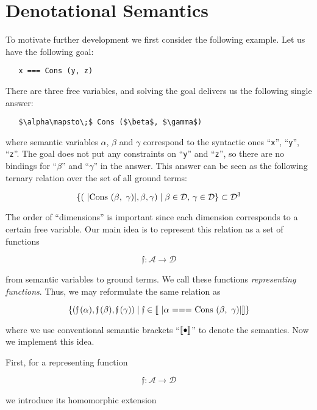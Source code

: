 \section{Denotational Semantics}
\label{denotational}

To motivate further development we first consider the following example. Let us have the following goal:

\begin{lstlisting}
   x === Cons (y, z)
\end{lstlisting}

There are three free variables, and solving the goal delivers us the following single answer:

\begin{lstlisting}
   $\alpha\mapsto\;$ Cons ($\beta$, $\gamma$)
\end{lstlisting}

where semantic variables $\alpha$, $\beta$ and $\gamma$ correspond to the syntactic ones ``\lstinline|x|'', ``\lstinline|y|'', ``\lstinline|z|''. The
goal does not put any constraints on ``\lstinline|y|'' and ``\lstinline|z|'', so there are no bindings for ``$\beta$'' and ``$\gamma$'' in the answer.
This answer can be seen as the following ternary relation over the set of all ground terms:

\[
\{(\mbox{\lstinline|Cons ($\beta$, $\,\gamma$)|}, \beta, \gamma) \mid \beta\in\mathcal{D},\,\gamma\in\mathcal{D}\}\subset\mathcal{D}^3
\]

The order of ``dimensions'' is important since each dimension corresponds to a certain free variable. Our main idea is to represent this relation as a set of functions 

\[
\mathfrak{f}:\mathcal{A}\to\mathcal{D}
\]

from semantic variables to ground terms. We call these functions \emph{representing functions}. Thus, we may reformulate the same relation as

\[
\{(\mathfrak{f}\,(\alpha),\mathfrak{f}\,(\beta),\mathfrak{f}\,(\gamma))\mid\mathfrak{f}\in\sembr{\mbox{\lstinline|$\alpha$ === Cons ($\beta$, $\,\gamma$)|}}\}
\]

where we use conventional semantic brackets ``$\llbracket{\bullet}\rrbracket$'' to denote the semantics. Now we implement this idea.

First, for a representing function

\[
\mathfrak{f} : \mathcal{A}\to\mathcal{D}
\]

we introduce its homomorphic extension 

